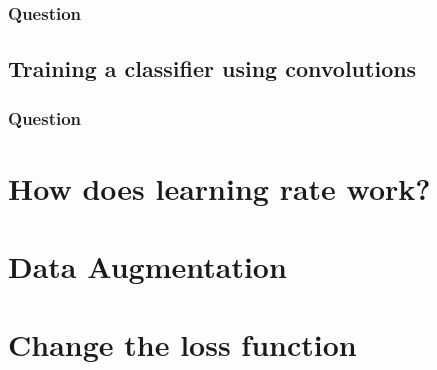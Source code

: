 \documentclass[12pt]{article}
\begin{document}
\subsubsection{Question}

\subsection{Training a classifier using convolutions}
\subsubsection{Question}

\section{How does learning rate work?}

\section{Data Augmentation}

\section{Change the loss function}
\end{document}
